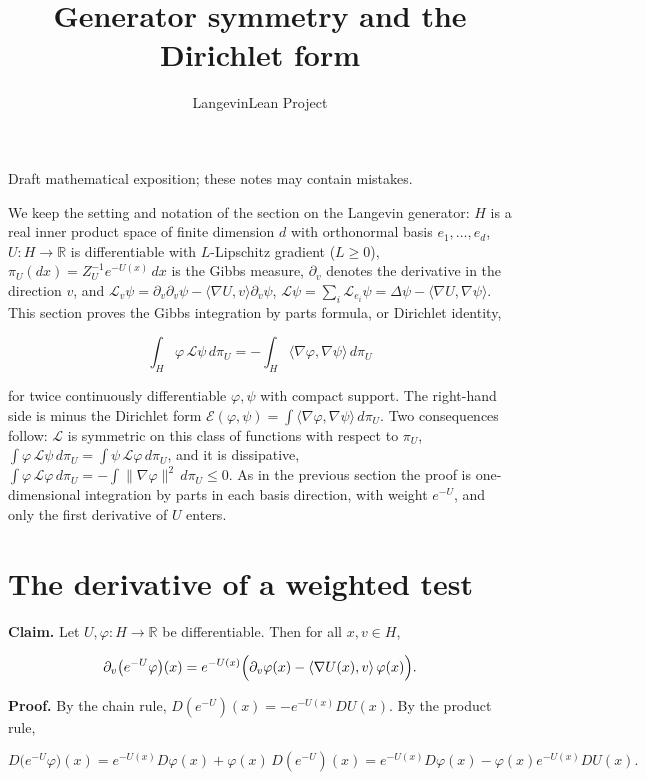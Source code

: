 \documentclass[11pt,a4paper]{article}
\title{\texorpdfstring{Generator symmetry and the Dirichlet form}{Generator symmetry and the Dirichlet form}}
\author{LangevinLean Project}
\date{}
\begin{document}
\maketitle
Draft mathematical exposition; these notes may contain mistakes.


We keep the setting and notation of the section on the Langevin generator: \(H\) is a real inner product space of finite dimension \(d\) with orthonormal basis \(e_1,\dots,e_d\), \(U:H\to\mathbb R\) is differentiable with \(L\)-Lipschitz gradient (\(L\ge0\)), \(\pi_U(dx)=Z_U^{-1}e^{-U(x)}\,dx\) is the Gibbs measure, \(\partial_v\) denotes the derivative in the direction \(v\), and \(\mathcal L_v\psi=\partial_v\partial_v\psi-\langle\nabla U,v\rangle\partial_v\psi\), \(\mathcal L\psi=\sum_i\mathcal L_{e_i}\psi=\Delta\psi-\langle\nabla U,\nabla\psi\rangle\). This section proves the Gibbs integration by parts formula, or Dirichlet identity,


\[\int_H\varphi\,\mathcal L\psi\,d\pi_U=-\int_H\langle\nabla\varphi,\nabla\psi\rangle\,d\pi_U\]


for twice continuously differentiable \(\varphi,\psi\) with compact support. The right-hand side is minus the Dirichlet form \(\mathcal E(\varphi,\psi)=\int\langle\nabla\varphi,\nabla\psi\rangle\,d\pi_U\). Two consequences follow: \(\mathcal L\) is symmetric on this class of functions with respect to \(\pi_U\), \(\int\varphi\,\mathcal L\psi\,d\pi_U=\int\psi\,\mathcal L\varphi\,d\pi_U\), and it is dissipative, \(\int\varphi\,\mathcal L\varphi\,d\pi_U=-\int\|\nabla\varphi\|^2\,d\pi_U\le0\). As in the previous section the proof is one-dimensional integration by parts in each basis direction, with weight \(e^{-U}\), and only the first derivative of \(U\) enters.


\section{\texorpdfstring{The derivative of a weighted test}{The derivative of a weighted test}}


\textbf{Claim.} Let \(U,\varphi:H\to\mathbb R\) be differentiable. Then for all \(x,v\in H\),


\[\partial_v\bigl(e^{-U}\varphi\bigr)(x)=e^{-U(x)}\Bigl(\partial_v\varphi(x)-\langle\nabla U(x),v\rangle\,\varphi(x)\Bigr).\]


\textbf{Proof.} By the chain rule, \(D(e^{-U})(x)=-e^{-U(x)}DU(x)\). By the product rule,


\[D\bigl(e^{-U}\varphi\bigr)(x)=e^{-U(x)}D\varphi(x)+\varphi(x)\,D(e^{-U})(x)=e^{-U(x)}D\varphi(x)-\varphi(x)e^{-U(x)}DU(x).\]
\end{document}
